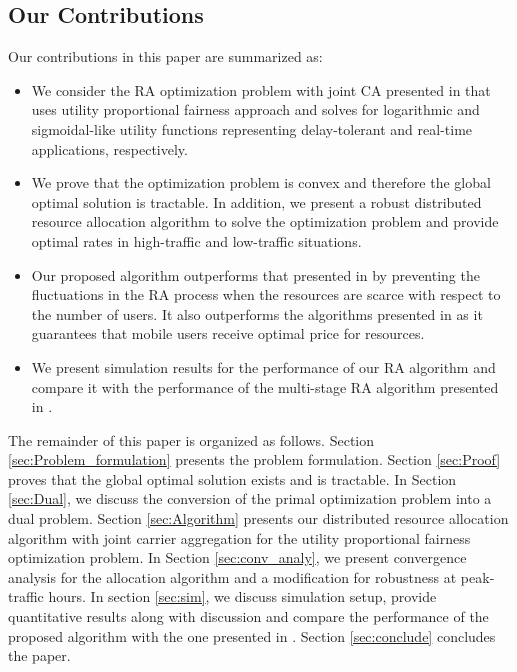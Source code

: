 \documentclass[journal]{IEEEtran} 		\usepackage{amsmath,amssymb}
\begin{document}
\subsection{Our Contributions}\label{sec:contributions}
Our contributions in this paper are summarized as:
\begin{itemize}
\item We consider the RA optimization problem with joint CA presented in \cite{Ahmed_Utility4} that uses utility proportional fairness approach and solves for logarithmic and sigmoidal-like utility functions representing delay-tolerant and real-time applications, respectively.
\item We prove that the optimization problem is convex and therefore the global optimal solution is tractable. In addition, we present a robust distributed resource allocation algorithm to solve the optimization problem and provide optimal rates in high-traffic and low-traffic situations. \item Our proposed algorithm outperforms that presented in \cite{Ahmed_Utility4} by preventing the fluctuations in the RA process when the resources are scarce with respect to the number of users. It also outperforms the algorithms presented in \cite{Haya_Utility1,Haya_Utility3,Haya_Utility6} as it guarantees that mobile users receive optimal price for resources.
\item We present simulation results for the performance of our RA algorithm and compare it with the performance of the multi-stage RA algorithm presented in \cite{Haya_Utility1,Haya_Utility3,Haya_Utility6}.\end{itemize}

The remainder of this paper is organized as follows. Section \ref{sec:Problem_formulation} presents the problem formulation. Section \ref{sec:Proof} proves that the global optimal solution exists and is tractable. In Section \ref{sec:Dual}, we discuss the conversion of the primal optimization problem into a dual problem. Section \ref{sec:Algorithm} presents our distributed resource allocation algorithm with joint carrier aggregation for the utility proportional fairness optimization problem. In Section \ref{sec:conv_analy}, we present convergence analysis for the allocation algorithm and a modification for robustness at peak-traffic hours. In section \ref{sec:sim}, we discuss simulation setup, provide quantitative results along with discussion and compare the performance of the proposed algorithm with the one presented in \cite{Haya_Utility1,Haya_Utility3,Haya_Utility6}. Section \ref{sec:conclude} concludes the paper.
\end{document}
